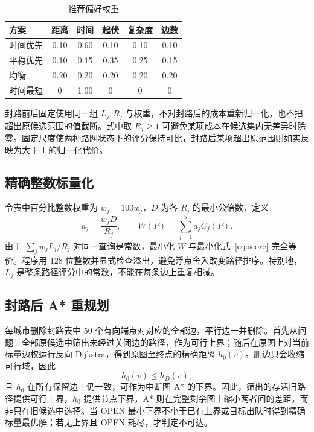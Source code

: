 \documentclass[UTF8,a4paper]{ctexart}
\begin{document}
\begin{table}[H]
\centering
\caption{推荐偏好权重}
\label{tab:weights}
\begin{tabular}{lccccc}
\toprule
方案 & 距离 & 时间 & 起伏 & 复杂度 & 边数 \\
\midrule
时间优先 & 0.10 & 0.60 & 0.10 & 0.10 & 0.10 \\
平稳优先 & 0.10 & 0.15 & 0.35 & 0.25 & 0.15 \\
均衡     & 0.20 & 0.20 & 0.20 & 0.20 & 0.20 \\
时间最短 & 0    & 1.00 & 0    & 0    & 0 \\
\bottomrule
\end{tabular}
\end{table}

封路前后固定使用同一组 $L_j,R_j$ 与权重，不对封路后的成本重新归一化，也不把超出原候选范围的值截断。式中取 $R_j\ge1$ 可避免某项成本在候选集内无差异时除零。固定尺度使两种路网状态下的评分保持可比，封路后某项超出原范围则如实反映为大于 1 的归一化代价。

\subsection{精确整数标量化}

令表中百分比整数权重为 $w_j=100\bar w_j$，$D$ 为各 $R_j$ 的最小公倍数，定义
\begin{equation}
a_j=\frac{w_jD}{R_j},\qquad
W(P)=\sum_{j=1}^{5}a_jC_j(P).
\end{equation}
由于 $\sum_j w_jL_j/R_j$ 对同一查询是常数，最小化 $W$ 与最小化式~\eqref{eq:score} 完全等价。程序用 128 位整数并显式检查溢出，避免浮点舍入改变路径排序。特别地，$L_j$ 是整条路径评分中的常数，不能在每条边上重复相减。

\subsection{封路后 A* 重规划}

每城市删除封路表中 50 个有向端点对对应的全部边，平行边一并删除。首先从问题三全部原候选中筛出未经过关闭边的路径，作为可行上界；随后在原图上对当前标量边权运行反向 Dijkstra，得到原图至终点的精确距离 $h_0(v)$。删边只会收缩可行域，因此
\begin{equation}
h_0(v)\le h_D(v),
\end{equation}
且 $h_0$ 在所有保留边上仍一致，可作为中断图 A* 的下界\cite{astar}。因此，筛出的存活旧路径提供可行上界，$h_0$ 提供节点下界，A* 则在完整剩余图上缩小两者间的差距，而非只在旧候选中选择。当 OPEN 最小下界不小于已有上界或目标出队时得到精确标量最优解；若无上界且 OPEN 耗尽，才判定不可达。
\end{document}

